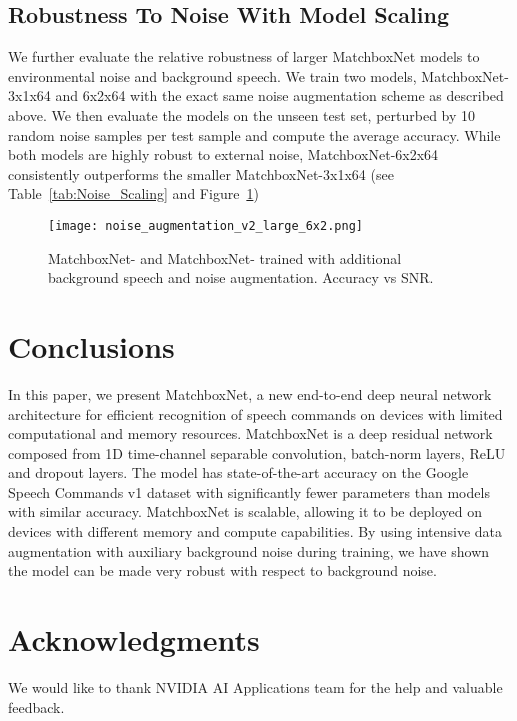 \documentclass[a4paper]{article}
\begin{document}
\subsection{Robustness To Noise With Model Scaling}

We further evaluate the relative robustness of larger MatchboxNet models to environmental noise and background speech. We train two models, MatchboxNet-3x1x64 and 6x2x64 with the exact same noise augmentation scheme as described above. We then evaluate the models on the unseen test set, perturbed by 10 random noise samples per test sample and compute the average accuracy. While both models are highly robust to external noise, MatchboxNet-6x2x64 consistently outperforms the smaller MatchboxNet-3x1x64 (see Table~\ref{tab:Noise_Scaling} and Figure~\ref{fig:noise_scaling_fig})

{\renewcommand{\arraystretch}{1.1}
\begin{table}[!h]
\caption{MatchboxNet- and MatchboxNet- trained with additional background speech and noise augmentation. Accuracy (\%) is averaged over 10 trials with random noise.}
\label{tab:Noise_Scaling}
\centering
{}
\end{table}
}

\begin{figure}[htb!]
  \centering
  \texttt{[image: noise\_augmentation\_v2\_large\_6x2.png]}
  \caption{MatchboxNet- and MatchboxNet- trained with additional background speech and noise augmentation. Accuracy vs SNR.}
  \label{fig:noise_scaling_fig}
\end{figure}


\section{Conclusions}
In this paper, we present MatchboxNet, a new end-to-end deep neural network architecture for efficient recognition of speech commands on devices with limited computational and memory resources. MatchboxNet is a deep residual network composed from 1D time-channel separable convolution, batch-norm layers, ReLU and dropout layers.
The model has state-of-the-art accuracy on the Google Speech Commands v1 dataset with significantly fewer parameters than models with similar accuracy. MatchboxNet is  scalable, allowing it to be deployed on devices with different memory and compute capabilities. By using intensive data augmentation with auxiliary background noise during training, we have shown the model can be made very robust with respect to background noise.

\section{Acknowledgments}
We would like to thank NVIDIA AI Applications team for the help and valuable feedback.


\end{document}
